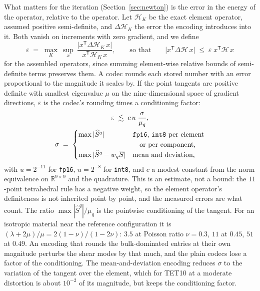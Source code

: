 \documentclass[sigconf,balance=false]{acmart}
\newcommand{\R}{\mathbb{R}}
\newcommand{\Sq}{\widehat{S}^{q}}
\newcommand{\Sbar}{\overline{S}}
\newcommand{\eps}{\varepsilon}
\newcommand{\ucodec}{u}
\begin{document}
What matters for the iteration (Section~\ref{sec:newton}) is the error in the energy of the
operator, relative to the operator.  Let $\mathcal{H}_K$ be the exact element operator, assumed
positive semi-definite, and $\Delta\mathcal{H}_K$ the error the encoding introduces into it.  Both
vanish on increments with zero gradient, and we define
\begin{equation}
  \eps \;=\; \max_K\ \sup_{x}\ \frac{\bigl|x^{\mathsf T}\Delta\mathcal{H}_K\,x\bigr|}
                                      {x^{\mathsf T}\mathcal{H}_K\,x} ,
  \qquad\text{so that}\qquad
  \bigl|x^{\mathsf T}\Delta\mathcal{H}\,x\bigr| \;\le\; \eps\; x^{\mathsf T}\mathcal{H}\,x
  \label{eq:eps}
\end{equation}
for the assembled operators, since summing element-wise relative bounds of semi-definite terms
preserves them.  A codec rounds each stored number with an error proportional to the magnitude it
scales by.  If the point tangents are positive definite with smallest eigenvalue $\mu$ on the
nine-dimensional space of gradient directions, $\eps$ is the codec's rounding times a conditioning
factor:
\begin{equation}
  \begin{gathered}
  \eps \;\lesssim\; c\,\ucodec\;\frac{\sigma}{\mu_q} ,\\
  \sigma \;=\;
  \begin{cases}
    \max|\Sq| & \text{\texttt{fp16}, \texttt{int8} per element}\\
              & \text{\quad or per component,}\\
    \max|\Sq - w_q\Sbar| & \text{mean and deviation,}
  \end{cases}
  \end{gathered}
  \label{eq:codecerror}
\end{equation}
with $\ucodec=2^{-11}$ for \texttt{fp16}, $\ucodec=2^{-8}$ for \texttt{int8}, and $c$ a modest
constant from the norm equivalence on $\R^{9\times9}$ and the quadrature.  This is an estimate, not
a bound: the $11$-point tetrahedral rule has a negative weight, so the element operator's
definiteness is not inherited point by point, and the measured errors are what count.  The ratio
$\max|\Sq|/\mu_q$ is the pointwise
conditioning of the tangent.  For an isotropic material near the reference configuration it is
$(\lambda+2\mu)/\mu = 2(1-\nu)/(1-2\nu)$: $3.5$ at Poisson ratio $\nu=0.3$, $11$ at $0.45$, $51$
at $0.49$.  An encoding that rounds the bulk-dominated entries at their own magnitude perturbs the
shear modes by that much, and the plain codecs lose a factor of the conditioning.  The
mean-and-deviation encoding reduces $\sigma$ to the variation of the tangent over the element,
which for TET10 at a moderate distortion is about $10^{-2}$ of its magnitude, but
keeps the conditioning factor.
\end{document}
